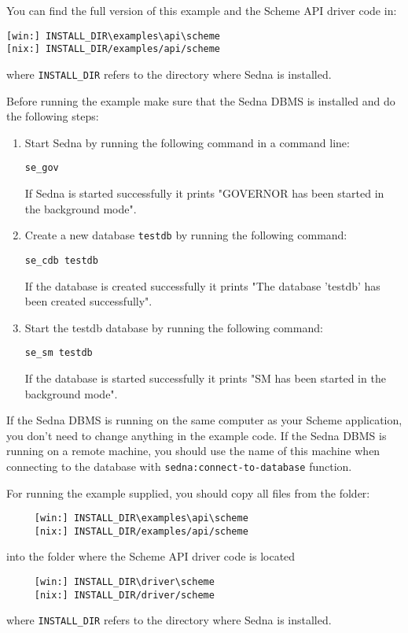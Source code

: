 \documentclass[a4paper,12pt]{article}
\begin{document}
You can find the full version of this example and the Scheme API driver code in:
\begin{verbatim}
[win:] INSTALL_DIR\examples\api\scheme
[nix:] INSTALL_DIR/examples/api/scheme
\end{verbatim}
where \verb!INSTALL_DIR! refers to the directory where Sedna is installed.

Before running the example make sure that the Sedna DBMS is installed and do the
following steps:

\begin{enumerate}
\item Start Sedna by running the following command in a command line:
\begin{verbatim}
se_gov
\end{verbatim}
If Sedna is started successfully it prints "GOVERNOR has been started in the
background mode".
\item Create a new database \verb!testdb! by running the following command:
\begin{verbatim}
se_cdb testdb
\end{verbatim}
If the database is created successfully it prints "The database 'testdb' has
been created successfully".
\item Start the testdb database by running the following command:
\begin{verbatim}
se_sm testdb
\end{verbatim}
If the database is started successfully it prints "SM has been started in the
background mode".
\end{enumerate}

If the Sedna DBMS is running on the same computer as your Scheme application,
you don't need to change anything in the example code. If the Sedna DBMS is
running on a remote machine, you should use the name of this machine when
connecting to the database with \texttt{sedna:connect-to-database} function.

For running the example supplied, you should copy all files from the folder:
\begin{verbatim}
     [win:] INSTALL_DIR\examples\api\scheme
     [nix:] INSTALL_DIR/examples/api/scheme
\end{verbatim}
into the folder where the Scheme API driver code is located
\begin{verbatim}
     [win:] INSTALL_DIR\driver\scheme
     [nix:] INSTALL_DIR/driver/scheme
\end{verbatim}
where \verb!INSTALL_DIR! refers to the directory where Sedna is installed.
\end{document}
